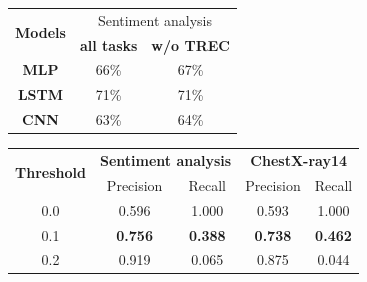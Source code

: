 \begin{table}[!b]
\begin{minipage}[t]{.40\textwidth}
	\vspace{-0.1in}
	\centering
	\begin{tabular}{c c c}
		\toprule
		\multirow{2}{*}{{\bf Models}} & \multicolumn{2}{c}{Sentiment analysis} \\
		& {\bf all tasks} & {\bf w/o TREC} \\
		\midrule
		{\bf MLP}  & 66\% & 67\% \\
		{\bf LSTM} & 71\% & 71\% \\
		{\bf CNN}  & 63\% & 64\% \\
		\bottomrule
		\end{tabular}
	\vspace{0.1in}
	\label{tab:taskonomy}
\end{minipage}%
\quad
\begin{minipage}[t]{.58\textwidth}
	\vspace{-0.1in}
	\centering
  \begin{tabular}{c c c c c}
	\toprule
		\multirow{2}{*}{{\bf Threshold}}  & \multicolumn{2}{c}{{\bf Sentiment
		analysis}} & \multicolumn{2}{c}{{\bf ChestX-ray14}} \\
		& Precision &  Recall & Precision &  Recall \\
		\cmidrule(lr){1-1} \cmidrule(lr){2-3} \cmidrule(lr){4-5}
		0.0 & 0.596 & 1.000 & 0.593 & 1.000 \\
		0.1 & \textbf{0.756} & \textbf{0.388} & \textbf{0.738} & \textbf{0.462} \\
		0.2 & 0.919 & 0.065 & 0.875 & 0.044 \\
	\bottomrule
	\end{tabular}
	\vspace{0.1in}
	\label{tab:mtl_better_than_stl}
\end{minipage}
\end{table}

